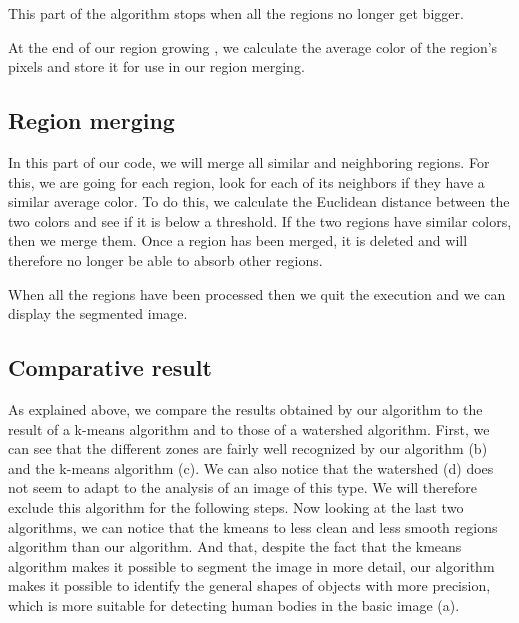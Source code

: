 \documentclass[conference]{IEEEtran}
\begin{document}
This part of the algorithm stops when all the regions no longer get bigger.

At the end of our region growing , we calculate the average color of the region's pixels and store it for use in our region merging.


\subsection{Region merging}

In this part of our code, we will merge all similar and neighboring regions. For this, we are going for each region, look for each of its neighbors if they have a similar average color. To do this, we calculate the Euclidean distance between the two colors and see if it is below a threshold. If the two regions have similar colors, then we merge them. Once a region has been merged, it is deleted and will therefore no longer be able to absorb other regions.

When all the regions have been processed then we quit the execution and we can display the segmented image.


\subsection{Comparative result}

As explained above, we compare the results obtained by our algorithm to the result of a k-means algorithm and to those of a watershed algorithm. First, we can see that the different zones are fairly well recognized by our algorithm (b) and the k-means algorithm (c). We can also notice that the watershed  (d) does not seem to adapt to the analysis of an image of this type. We will therefore exclude this algorithm for the following steps.
Now looking at the last two algorithms, we can notice that the kmeans to less clean and less smooth regions algorithm than our algorithm. And that, despite the fact that the kmeans algorithm makes it possible to segment the image in more detail, our algorithm makes it possible to identify the general shapes of objects with more precision, which is more suitable for detecting human bodies in the basic image (a).
\end{document}
